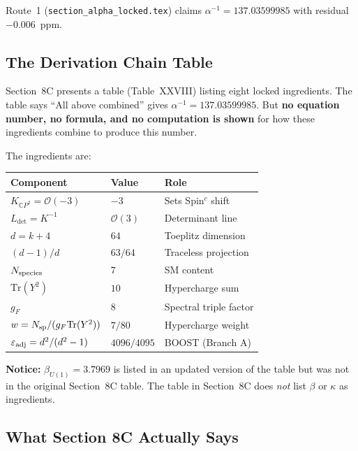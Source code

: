 \documentclass[12pt,a4paper]{article}
\begin{document}
Route~1 (\texttt{section\_alpha\_locked.tex}) claims
$\alpha^{-1} = 137.03599985$ with residual $-0.006$~ppm.

\subsection{The Derivation Chain Table}

Section~8C presents a table (Table~XXVIII) listing eight locked
ingredients. The table says ``All above combined'' gives
$\alpha^{-1} = 137.03599985$. But \textbf{no equation number,
no formula, and no computation is shown} for how these ingredients
combine to produce this number.

The ingredients are:
\begin{center}
\renewcommand{\arraystretch}{1.2}
\begin{tabular}{lll}
\toprule
Component & Value & Role \\
\midrule
$K_{\mathbb{C}P^2} = \mathcal{O}(-3)$ & $-3$ & Sets Spin$^c$ shift \\
$L_{\det} = K^{-1}$ & $\mathcal{O}(3)$ & Determinant line \\
$d = k+4$ & $64$ & Toeplitz dimension \\
$(d-1)/d$ & $63/64$ & Traceless projection \\
$N_{\rm species}$ & $7$ & SM content \\
$\text{Tr}(Y^2)$ & $10$ & Hypercharge sum \\
$g_F$ & $8$ & Spectral triple factor \\
$w = N_{\rm sp}/(g_F\text{Tr}(Y^2))$ & $7/80$ & Hypercharge weight \\
$\varepsilon_{\rm adj} = d^2/(d^2-1)$ & $4096/4095$ & BOOST (Branch A) \\
\bottomrule
\end{tabular}
\end{center}

\textbf{Notice:} $\beta_{U(1)} = 3.7969$ is listed in an updated version
of the table but was not in the original Section~8C table. The table
in Section~8C does \emph{not} list $\beta$ or $\kappa$ as ingredients.

\subsection{What Section 8C Actually Says}
\end{document}
